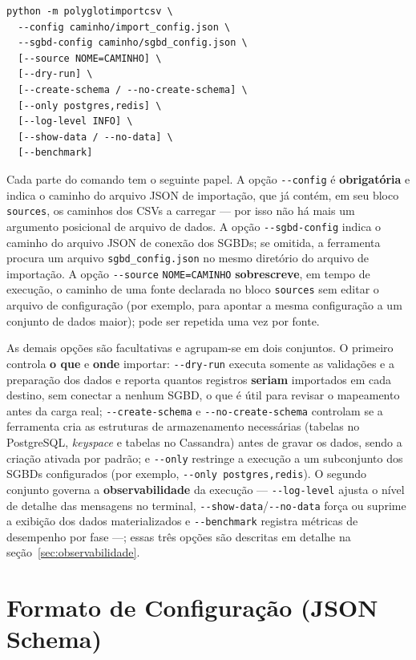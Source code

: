 \begin{lstlisting}[style=bashstyle]
python -m polyglotimportcsv \
  --config caminho/import_config.json \
  --sgbd-config caminho/sgbd_config.json \
  [--source NOME=CAMINHO] \
  [--dry-run] \
  [--create-schema / --no-create-schema] \
  [--only postgres,redis] \
  [--log-level INFO] \
  [--show-data / --no-data] \
  [--benchmark]
\end{lstlisting}

Cada parte do comando tem o seguinte papel. A opção \texttt{-{}-config} é
\textbf{obrigatória} e indica o caminho do arquivo JSON de importação, que já contém, em
seu bloco \texttt{sources}, os caminhos dos CSVs a carregar --- por isso não há mais um
argumento posicional de arquivo de dados. A opção \texttt{-{}-sgbd-config} indica o
caminho do arquivo JSON de conexão dos SGBDs; se omitida, a ferramenta procura um arquivo
\texttt{sgbd\_config.json} no mesmo diretório do arquivo de importação. A opção
\texttt{-{}-source} \texttt{NOME=CAMINHO} \textbf{sobrescreve}, em tempo de execução, o
caminho de uma fonte declarada no bloco \texttt{sources} sem editar o arquivo de
configuração (por exemplo, para apontar a mesma configuração a um conjunto de dados
maior); pode ser repetida uma vez por fonte.

As demais opções são facultativas e agrupam-se em dois conjuntos. O primeiro controla
\textbf{o que} e \textbf{onde} importar: \texttt{-{}-dry-run} executa somente as
validações e a preparação dos dados e reporta quantos registros \textbf{seriam}
importados em cada destino, sem conectar a nenhum SGBD, o que é útil para revisar o
mapeamento antes da carga real; \texttt{-{}-create-schema} e
\texttt{-{}-no-create-schema} controlam se a ferramenta cria as estruturas de
armazenamento necessárias (tabelas no PostgreSQL, \textit{keyspace} e tabelas no
Cassandra) antes de gravar os dados, sendo a criação ativada por padrão; e
\texttt{-{}-only} restringe a execução a um subconjunto dos SGBDs configurados (por
exemplo, \texttt{-{}-only postgres,redis}). O segundo conjunto governa a
\textbf{observabilidade} da execução --- \texttt{-{}-log-level} ajusta o nível de detalhe
das mensagens no terminal, \texttt{-{}-show-data}/\texttt{-{}-no-data} força ou suprime a
exibição dos dados materializados e \texttt{-{}-benchmark} registra métricas de
desempenho por fase ---; essas três opções são descritas em detalhe na
seção~\ref{sec:observabilidade}.


\section{Formato de Configuração (JSON Schema)}
\label{sec:config-format}

